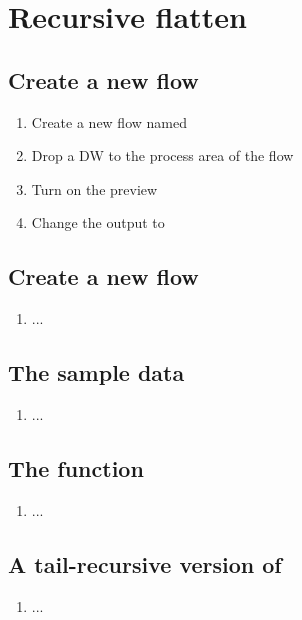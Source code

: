 \section{Recursive flatten}

\subsection{Create a new flow}
\begin{enumerate}
\item Create a new flow named 
\item Drop a DW to the process area of the flow
\item Turn on the preview
\item Change the output to 
\end{enumerate}

\subsection{Create a new flow}
\begin{enumerate}[resume*]
\item ...
\end{enumerate}

\subsection{The sample data}
\begin{enumerate}[resume*]
\item ...
\end{enumerate}

\subsection{The  function}
\begin{enumerate}[resume*]
\item ...
\end{enumerate}

\subsection{A tail-recursive version of }
\begin{enumerate}[resume*]
\item ...
\end{enumerate}


